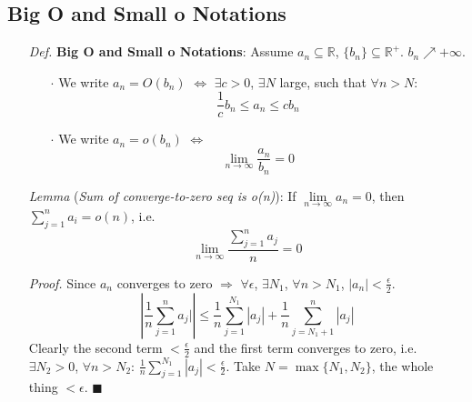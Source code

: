 \documentclass[a4paper,12pt,twoside]{book}
\begin{document}
\subsection{Big O and Small o Notations}
\begin{itemize}
	\item[\textit{Def.}] \textbf{Big O and Small o Notations}: Assume ${a_n}\subseteq \mathbb{R}$, $\{b_n\} \subseteq \mathbb{R}^+$. $b_n \nearrow +\infty$.
	\begin{itemize}
		\item[$\cdot$] We write $a_n = O(b_n)$ $\iff$ $\exists c>0$, $\exists N$ large, such that $\forall n>N$:
		\begin{equation}
			\frac{1}{c}b_n \leq a_n \leq cb_n
		\end{equation}

		\item[$\cdot$] We write $a_n = o(b_n)$ $\iff$ 
		\begin{equation}
			\lim\limits_{n\rightarrow\infty}\frac{a_n}{b_n}=0
		\end{equation}
	\end{itemize}

	\item[\textit{Lemma}] (\textit{Sum of converge-to-zero seq is o(n)}): If $\lim\limits_{n\rightarrow\infty}a_n=0$, then $\sum_{j=1}^na_i=o(n)$, i.e. 
	\begin{equation}
		\lim\limits_{n\rightarrow\infty} \frac{\sum_{j=1}^n a_j}{n}=0
	\end{equation}

	\item[\textit{Proof.}] Since $a_n$ converges to zero $\Rightarrow$ $\forall \epsilon$, $\exists N_1$, $\forall n>N_1$, $|a_n|<\frac{\epsilon}{2}$.
	\begin{equation}
		\left|\frac{1}{n}\sum_{j=1}^n a_j|\right|\leq \frac{1}{n}\sum_{j=1}^{N_1}|a_j| + \frac{1}{n} \sum_{j=N_1+1}^n |a_j|
	\end{equation}
	Clearly the second term $<\frac{\epsilon}{2}$ and the first term converges to zero, i.e. $\exists N_2>0$, $\forall n>N_2$: $\frac{1}{n}\sum_{j=1}^{N_1}|a_j|<\frac{\epsilon}{2}$. Take $N=\max\{N_1, N_2\}$, the whole thing $<\epsilon$. $\blacksquare$

\end{itemize}

\end{document}
